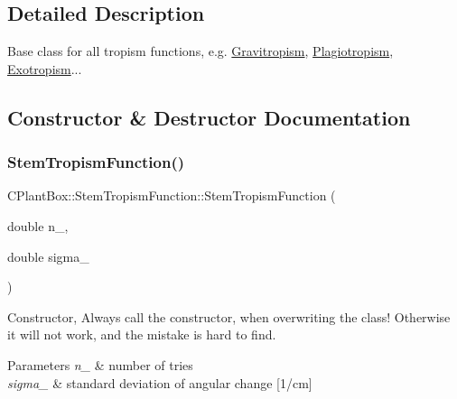 \subsection{Detailed Description}
Base class for all tropism functions, e.\+g. \hyperlink{classCPlantBox_1_1Gravitropism}{Gravitropism}, \hyperlink{classCPlantBox_1_1Plagiotropism}{Plagiotropism}, \hyperlink{classCPlantBox_1_1Exotropism}{Exotropism}... 

\subsection{Constructor \& Destructor Documentation}
\mbox{\label{classCPlantBox_1_1StemTropismFunction_a877c9c50285d33a85687a6afccbc0439}} 
\subsubsection{\texorpdfstring{Stem\+Tropism\+Function()}{StemTropismFunction()}\hspace{0.1cm}{\footnotesize\ttfamily [1/2]}}
{\footnotesize\ttfamily C\+Plant\+Box\+::\+Stem\+Tropism\+Function\+::\+Stem\+Tropism\+Function (\begin{DoxyParamCaption}\item[{double}]{n\+\_\+,  }\item[{double}]{sigma\+\_\+ }\end{DoxyParamCaption})\hspace{0.3cm}{\ttfamily [inline]}}

Constructor, Always call the constructor, when overwriting the class! Otherwise it will not work, and the mistake is hard to find.


\begin{DoxyParams}{Parameters}
{\em n\+\_\+} & number of tries \\
\hline
{\em sigma\+\_\+} & standard deviation of angular change \mbox{[}1/cm\mbox{]} \\
\hline
\end{DoxyParams}
\mbox{\label{classCPlantBox_1_1StemTropismFunction_ae4501c86140ef215dcc0f0e0b3962a6f}} 
